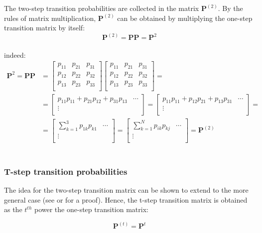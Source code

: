 \documentclass[\main/main.tex]{subfiles}
\begin{document}
\noindent The two-step transition probabilities are collected in the matrix $\mathbf{P}^{(2)}$. By the rules of matrix multiplication,  $\mathbf{P}^{(2)}$ can be obtained by multiplying the one-step transition matrix by itself:
\begin{equation}
    \mathbf{P}^{(2)} = \mathbf{P} \mathbf{P} = \mathbf{P}^2 
\end{equation}\\
indeed:
\begin{equation}
\begin{split}
  \mathbf{P}^2 = \mathbf{P} \mathbf{P} &= 
\begin{bmatrix}
p_{11} & p_{21} & p_{31} \\
p_{12} & p_{22} & p_{32}  \\
p_{13} & p_{23} & p_{33}  \\
\end{bmatrix}
\begin{bmatrix}
p_{11} & p_{21} & p_{31} \\
p_{12} & p_{22} & p_{32}  \\
p_{13} & p_{23} & p_{33}  \\
\end{bmatrix}=\\
&= 
\begin{bmatrix}
p_{11}p_{11} + p_{21}p_{12} + p_{31}p_{13} & \cdots \\
\vdots\\
\end{bmatrix} =
\begin{bmatrix}
p_{11}p_{11} + p_{12}p_{21} + p_{13}p_{31} & \cdots \\
\vdots\\
\end{bmatrix} =\\
&= 
\begin{bmatrix}
\sum_{k=1}^3 p_{1k}p_{k1} & \cdots\\
\vdots\\
\end{bmatrix} = 
\begin{bmatrix}
\sum_{k=1}^N p_{ik}p_{kj} & \cdots\\
\vdots\\
\end{bmatrix} = 
\mathbf{P}^{(2)} 
\end{split}
\end{equation}\\




\subsubsection{T-step transition probabilities }

The idea for the two-step transition matrix can be shown to extend to the more general case (see \citep{Sheskin2010} or \cite{Holmes2015} for a proof). Hence, the t-step transition matrix is obtained as the  $t^{th}$ power the one-step transition matrix:

\begin{equation}
    \mathbf{P}^{(t)} = \mathbf{P}^t
\end{equation}
\end{document}
